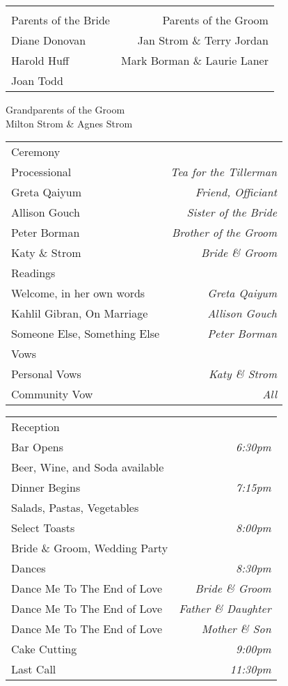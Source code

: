 \documentclass[11pt]{article}
\makeatletter
\newcommand*\ColText[1]{\textcolor{Goldenrod3}{#1}}
\newenvironment{Group}[1]
  {\noindent\begin{tabular*}{\textwidth}{@{}p{.5\textwidth}@{\extracolsep{\fill}}r@{}}
    {\fontsize{24}{29}\selectfont\ColText{#1}}\\[0.8em]}
  {\end{tabular*}}
\newcommand*\CenteredEntry[1]{%
  \sffamily #1}
\newcommand*\CenteredExpl[1]{%
  \footnotesize #1}
\newcommand*\LREntry[2]{%
  \sffamily #1 & \sffamily #2}
\newcommand*\LRExpl[2]{%
  \footnotesize #1 & \footnotesize #2}
\newcommand*\Entry[2]{%
  \sffamily #1 & \footnotesize\textit{#2}}
\newcommand*\Expl[2]{%
  \hspace*{1em}\footnotesize #1 & \footnotesize\textit{#2}}
\makeatother
\begin{document}
\begin{Group}{}
\LREntry{Parents of the Bride}{Parents of the Groom} \\
\LRExpl{Diane Donovan}{Jan Strom \& Terry Jordan} \\
\LRExpl{Harold Huff}{Mark Borman \& Laurie Laner} \\
\LRExpl{Joan Todd}{}
\end{Group}
\begin{center}
\CenteredEntry{Grandparents of the Groom} \\
\CenteredExpl{Milton Strom \& Agnes Strom}
\end{center}

\vfill

\begin{Group}{Ceremony}
\Entry{Processional}{Tea for the Tillerman}\\
\Expl{Greta Qaiyum}{Friend, Officiant}\\
\Expl{Allison Gouch}{Sister of the Bride}\\
\Expl{Peter Borman}{Brother of the Groom}\\
\Expl{Katy \& Strom}{Bride \& Groom} \\
\Entry{Readings}{} \\
\Expl{Welcome, in her own words} {Greta Qaiyum} \\
\Expl{Kahlil Gibran, On Marriage} {Allison Gouch} \\
\Expl{Someone Else, Something Else}{Peter Borman} \\
\Entry{Vows}{} \\
\Expl{Personal Vows}{Katy \& Strom}\\
\Expl{Community Vow}{All}\\
\end{Group}

\vfill

\begin{Group}{Reception}
\Entry{Bar Opens}{6:30pm} \\
\Expl{Beer, Wine, and Soda available}{} \\
\Entry{Dinner Begins}{7:15pm} \\
\Expl{Salads, Pastas, Vegetables}{} \\
\Entry{Select Toasts}{8:00pm} \\
\Expl{Bride \& Groom, Wedding Party}{} \\
\Entry{Dances}{8:30pm} \\
\Expl{Dance Me To The End of Love}{Bride \& Groom} \\
\Expl{Dance Me To The End of Love}{Father \& Daughter} \\
\Expl{Dance Me To The End of Love}{Mother \& Son} \\
\Entry{Cake Cutting}{9:00pm} \\
\Entry{Last Call}{11:30pm}
\end{Group}
\end{document}
